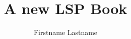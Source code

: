 \author{Firstname Lastname}
\title{A new LSP Book}

\renewcommand{\lsSeries}{}
\newcommand{\lsSeriesTitle}{}
\newcommand{\lsSeriesColor}{gray}
\renewcommand{\lsSeriesNumber}{}



